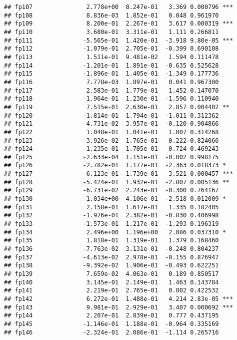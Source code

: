 \documentclass[
]{article}
\begin{document}
\begin{verbatim}
## fp107               2.778e+00  8.247e-01   3.369 0.000796 ***
## fp108               8.836e-03  1.852e-01   0.048 0.961970    
## fp109               8.200e-01  2.267e-01   3.617 0.000319 ***
## fp110               3.680e-01  3.311e-01   1.111 0.266811    
## fp111              -5.565e-01  1.420e-01  -3.918 9.80e-05 ***
## fp112              -1.079e-01  2.705e-01  -0.399 0.690108    
## fp113               1.511e-01  9.481e-02   1.594 0.111478    
## fp114              -1.201e-01  1.891e-01  -0.635 0.525628    
## fp115              -1.896e-01  1.405e-01  -1.349 0.177736    
## fp116               7.778e-03  1.897e-01   0.041 0.967300    
## fp117               2.583e-01  1.779e-01   1.452 0.147070    
## fp118              -1.964e-01  1.230e-01  -1.596 0.110940    
## fp119               7.515e-01  2.630e-01   2.857 0.004402 ** 
## fp120              -1.814e-01  1.794e-01  -1.011 0.312362    
## fp121              -4.731e-02  3.957e-01  -0.120 0.904866    
## fp122               1.048e-01  1.041e-01   1.007 0.314268    
## fp123               3.926e-02  1.765e-01   0.222 0.824066    
## fp124               1.235e-01  1.705e-01   0.724 0.469243    
## fp125              -2.633e-04  1.151e-01  -0.002 0.998175    
## fp126              -2.782e-01  1.177e-01  -2.363 0.018373 *  
## fp127              -6.123e-01  1.739e-01  -3.521 0.000457 ***
## fp128              -5.424e-01  1.932e-01  -2.807 0.005136 ** 
## fp129              -6.731e-02  2.243e-01  -0.300 0.764167    
## fp130              -1.034e+00  4.106e-01  -2.518 0.012009 *  
## fp131               2.158e-01  1.617e-01   1.335 0.182405    
## fp132              -1.976e-01  2.382e-01  -0.830 0.406998    
## fp133              -1.573e-01  1.217e-01  -1.293 0.196319    
## fp134               2.496e+00  1.196e+00   2.086 0.037310 *  
## fp135               1.818e-01  1.319e-01   1.379 0.168460    
## fp136              -7.763e-02  3.131e-01  -0.248 0.804237    
## fp137              -4.613e-02  2.978e-01  -0.155 0.876947    
## fp138              -9.392e-02  1.906e-01  -0.493 0.622251    
## fp139               7.659e-02  4.063e-01   0.189 0.850517    
## fp140               3.145e-01  2.149e-01   1.463 0.143784    
## fp141               2.219e-01  2.765e-01   0.802 0.422532    
## fp142               6.272e-01  1.488e-01   4.214 2.83e-05 ***
## fp143               9.981e-01  2.929e-01   3.407 0.000692 ***
## fp144               2.207e-01  2.839e-01   0.777 0.437195    
## fp145              -1.146e-01  1.188e-01  -0.964 0.335169    
## fp146              -2.324e-01  2.086e-01  -1.114 0.265716    

\end{verbatim}
\end{document}
